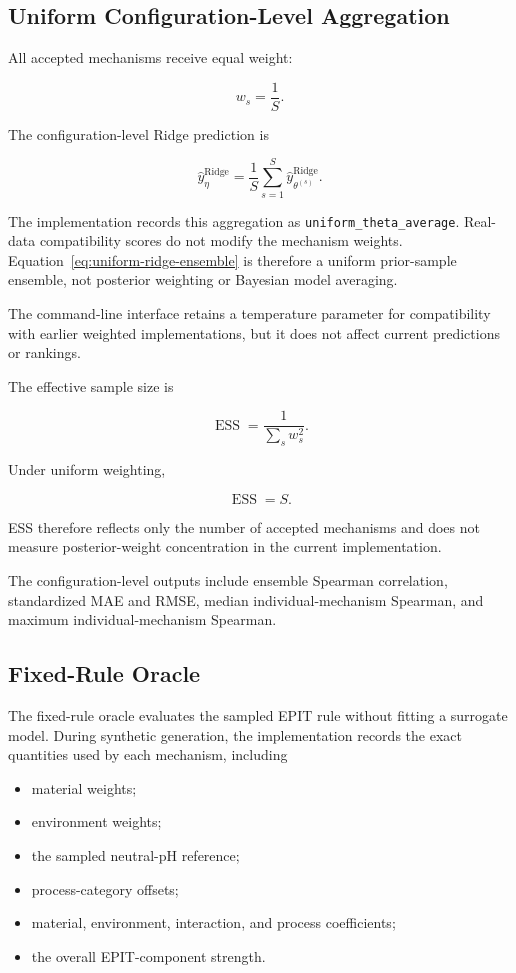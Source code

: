 \documentclass{article}
\begin{document}
\subsection{Uniform Configuration-Level Aggregation}

All accepted mechanisms receive equal weight:

\[
w_s=\frac{1}{S}.
\]

The configuration-level Ridge prediction is

\begin{equation}
\widehat y_{\eta}^{\mathrm{Ridge}}
=
\frac{1}{S}
\sum_{s=1}^{S}
\widehat y_{\theta^{(s)}}^{\mathrm{Ridge}}.
\label{eq:uniform-ridge-ensemble}
\end{equation}

The implementation records this aggregation as
\texttt{uniform\_theta\_average}. Real-data compatibility scores do not modify the mechanism weights. Equation~\eqref{eq:uniform-ridge-ensemble} is therefore a uniform prior-sample ensemble, not posterior weighting or Bayesian model averaging.

The command-line interface retains a temperature parameter for compatibility with earlier weighted implementations, but it does not affect current predictions or rankings.

The effective sample size is

\[
\operatorname{ESS}
=
\frac{1}{\sum_sw_s^2}.
\]

Under uniform weighting,

\[
\operatorname{ESS}=S.
\]

ESS therefore reflects only the number of accepted mechanisms and does not measure posterior-weight concentration in the current implementation.

The configuration-level outputs include ensemble Spearman correlation, standardized MAE and RMSE, median individual-mechanism Spearman, and maximum individual-mechanism Spearman.

\subsection{Fixed-Rule Oracle}

The fixed-rule oracle evaluates the sampled EPIT rule without fitting a surrogate model. During synthetic generation, the implementation records the exact quantities used by each mechanism, including

\begin{itemize}
    \item material weights;
    \item environment weights;
    \item the sampled neutral-pH reference;
    \item process-category offsets;
    \item material, environment, interaction, and process coefficients;
    \item the overall EPIT-component strength.
\end{itemize}
\end{document}
